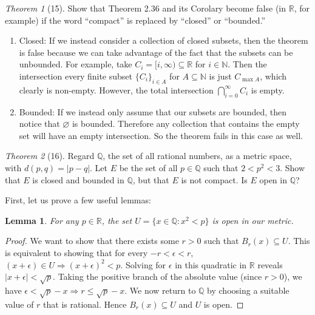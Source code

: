 \documentclass[12pt]{article}
\newtheorem*{lemma}{Lemma}
\theoremstyle{remark}
\theoremstyle{named}
\newtheorem*{theorem}{Theorem}
\renewcommand{\implies}{\Rightarrow}
\begin{document}
\begin{theorem}[15]
    Show that Theorem 2.36 and its Corolary become false (in $\mathbb R$, for example) if the word ``compact'' is replaced by ``closed'' or ``bounded.''
\end{theorem}

\begin{enumerate}
    \item Closed: If we instead consider a collection of closed subsets, then the theorem is false because we can take advantage of the fact that the subsets can be unbounded. For example, take \(C_i = [i, \infty) \subseteq \mathbb R\) for \(i \in \mathbb N\). Then the intersection every finite subset \(\{C_i\}_{i \in A}\) for \(A \subseteq \mathbb N\) is just \(C_{\max A}\), which clearly is non-empty. However, the total intersection \(\bigcap_{i = 0}^\infty C_i\) is empty. 
    
    \item Bounded: If we instead only assume that our subsets are bounded, then notice that \(\varnothing\) is bounded. Therefore any collection that contains the empty set will have an empty intersection. So the theorem fails in this case as well.
\end{enumerate}

\begin{theorem}[16]
    Regard $\mathbb Q$, the set of all rational numbers, as a metric space, with $d(p, q) = |p - q|$. Let $E$ be the set of all $p \in \mathbb Q$ such that $2 < p^2 < 3$. Show that $E$ is closed and bounded in $\mathbb Q$, but that $E$ is not compact. Is $E$ open in $\mathbb Q$?
\end{theorem}

First, let us prove a few useful lemmas:

\begin{lemma}
    For any \(p \in \mathbb R\), the set \(U = \{x \in \mathbb Q : x^2 < p\}\) is open in our metric. 
\end{lemma}

\begin{proof}
    We want to show that there exists some \(r > 0\) such that \(B_r(x) \subseteq U\). This is equivalent to showing that for every \(-r < \epsilon  < r\), \((x + \epsilon) \in U \implies (x + \epsilon)^2 < p\). Solving for \(\epsilon\) in this quadratic in \(\mathbb R\) reveals \(|x + \epsilon| < \sqrt{p}\). 
    Taking the positive branch of the absolute value (since \(r > 0\)), we have \(\epsilon < \sqrt{p} - x \implies r \le \sqrt p - x\). We now return to \(\mathbb Q\) by choosing a suitable value of \(r\) that is rational. Hence \(B_r(x) \subseteq U\) and \(U\) is open.
\end{proof}
\end{document}

